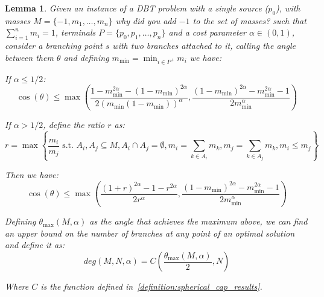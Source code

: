 \documentclass[11pt,reqno,a4paper]{amsart}
\numberwithin{equation}{section}
\theoremstyle{mytheorem}
\newtheorem{lemma}[subsection]{Lemma}
\theoremstyle{myremark}
\theoremstyle{myparagraph}
\begin{document}
    \begin{lemma}
        \label{lemma:degree_definition}
        Given an instance of a DBT problem with a single source ($p_0$), with masses $M=\{-1, m_1, \dots, m_n\}$
            {\color{red} why did you add $-1$ to the set of masses?}
        such that $\sum_{i =1}^{n} m_i = 1$, terminals $P=\{p_0, p_1, \dots, p_n\}$ and
        a cost parameter $\alpha \in (0,1)$, consider a branching point $s$ with two branches attached to it,
        calling the angle between them $\theta$ and defining $m_{\min} = \min_{i \in P^+} m_i$ we have:

        If $\alpha \le 1/2$:
        \begin{equation}
            \cos(\theta) \le \max\left(
            \frac{1 - m_{\min}^{2\alpha} - (1-m_{\min})^{2\alpha}}{2(m_{\min}(1-m_{\min}))^\alpha},
            \frac{(1-m_{\min})^{2\alpha} - m_{\min}^{2\alpha} - 1}{2m_{\min}^\alpha}
            \right)
        \end{equation}

        If $\alpha > 1/2$, define the ratio $r$ as:
        \begin{equation}
            \label{eq:ratio_definition}
            r = \max \left\{ \frac{m_i}{m_j} \text{  s.t.  } A_i, A_j \subseteq M, A_i \cap A_j = \emptyset, m_i = \sum_{k \in A_i} m_k, m_j = \sum_{k \in A_j} m_k, m_i \le m_j \right\}
        \end{equation}

        Then we have:
        \begin{equation}
            \cos(\theta) \le \max\left(
            \frac{ (1+r)^{2\alpha} - 1 - r^{2\alpha}}{2r^\alpha},
            \frac{(1-m_{\min})^{2\alpha} - m_{\min}^{2\alpha} - 1}{2m_{\min}^\alpha}
            \right)
        \end{equation}


        Defining $\theta_{\max}(M, \alpha)$ as the angle that achieves the maximum above, we can find an upper bound on the number of branches
        at any point of an optimal solution and define it as:
        \begin{equation}
            deg(M, N, \alpha) = C\left( \frac{ \theta_{\max}(M, \alpha) }{2}, N\right)
        \end{equation}

        Where $C$ is the function defined in~\ref{definition:spherical_cap_results}.
    \end{lemma}
\end{document}
